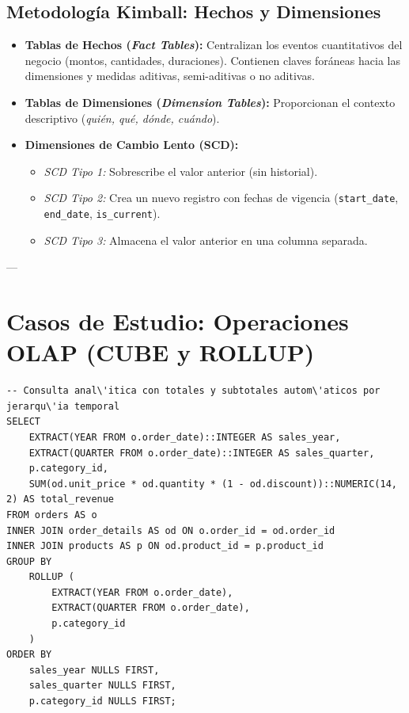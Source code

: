 \subsection{Metodolog\'ia Kimball: Hechos y Dimensiones}
\begin{itemize}
    \item \textbf{Tablas de Hechos (\textit{Fact Tables}):} Centralizan los eventos cuantitativos del negocio (montos, cantidades, duraciones). Contienen claves for\'aneas hacia las dimensiones y medidas aditivas, semi-aditivas o no aditivas.
    \item \textbf{Tablas de Dimensiones (\textit{Dimension Tables}):} Proporcionan el contexto descriptivo (\textit{qui\'en, qu\'e, d\'onde, cu\'ando}).
    \item \textbf{Dimensiones de Cambio Lento (SCD):}
    \begin{itemize}
        \item \textit{SCD Tipo 1:} Sobrescribe el valor anterior (sin historial).
        \item \textit{SCD Tipo 2:} Crea un nuevo registro con fechas de vigencia (\texttt{start\_date}, \texttt{end\_date}, \texttt{is\_current}).
        \item \textit{SCD Tipo 3:} Almacena el valor anterior en una columna separada.
    \end{itemize}
\end{itemize}

---

\section{Casos de Estudio: Operaciones OLAP (CUBE y ROLLUP)}

\begin{lstlisting}[style=sqlstyle, caption={Agregaci\'on multidimensional jer\'arquica con ROLLUP}]
-- Consulta anal\'itica con totales y subtotales autom\'aticos por jerarqu\'ia temporal
SELECT
    EXTRACT(YEAR FROM o.order_date)::INTEGER AS sales_year,
    EXTRACT(QUARTER FROM o.order_date)::INTEGER AS sales_quarter,
    p.category_id,
    SUM(od.unit_price * od.quantity * (1 - od.discount))::NUMERIC(14, 2) AS total_revenue
FROM orders AS o
INNER JOIN order_details AS od ON o.order_id = od.order_id
INNER JOIN products AS p ON od.product_id = p.product_id
GROUP BY
    ROLLUP (
        EXTRACT(YEAR FROM o.order_date),
        EXTRACT(QUARTER FROM o.order_date),
        p.category_id
    )
ORDER BY
    sales_year NULLS FIRST,
    sales_quarter NULLS FIRST,
    p.category_id NULLS FIRST;
\end{lstlisting}

